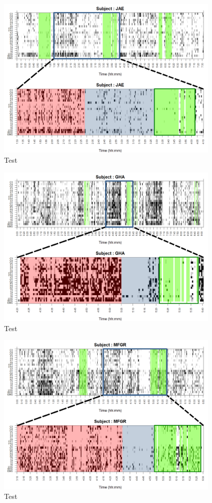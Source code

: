 \begin{figure}
\includegraphics[width=0.95\textwidth]
{./img_ejemplos/zoom_JAE.pdf}
\caption{Test}
\label{test3}
\end{figure}

\begin{figure}
\includegraphics[width=0.95\textwidth]
{./img_ejemplos/zoom_GHA.pdf}
\caption{Test}
\label{test4}
\end{figure}


\begin{figure}
\includegraphics[width=0.95\textwidth]
{./img_ejemplos/zoom_MFGR.pdf}
\caption{Test}
\label{test5}
\end{figure}

